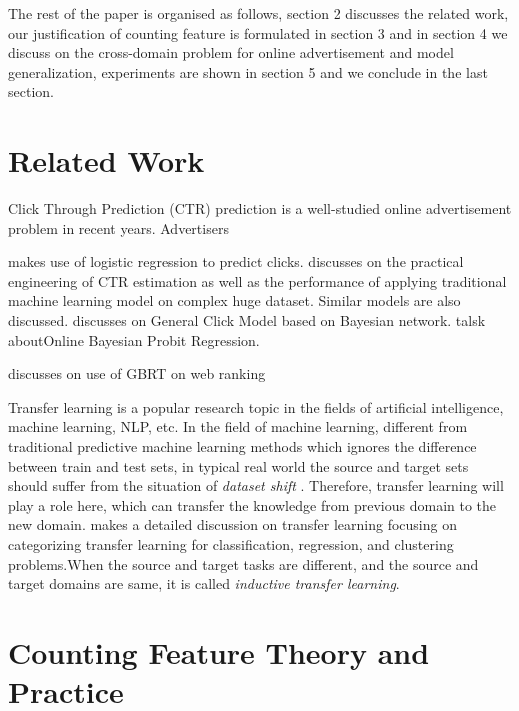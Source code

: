 \documentclass{sig-alternate}
\begin{document}
The rest of the paper is organised as follows, section 2 discusses the related work, our justification of counting feature is formulated in section 3 and in section 4 we discuss on the cross-domain problem for online advertisement and model generalization, experiments are shown in section 5 and we conclude in the last section.



\section{Related Work}



Click Through Prediction (CTR) prediction is a well-studied online advertisement problem in recent years. Advertisers 



 \cite{richardson2007predicting} makes use of logistic regression to predict clicks. \cite{mcmahan2013ad} discusses on the practical engineering of CTR estimation as well as the performance of applying traditional machine learning model on complex huge dataset. Similar models are also discussed. \cite{zhu2010novel} discusses on General Click Model based on Bayesian network. \cite{graepel2010web} talsk aboutOnline Bayesian Probit Regression. 


\cite{mohan2011web} discusses on use of GBRT on web ranking


Transfer learning is a popular research topic in the fields of artificial intelligence, machine learning, NLP, etc. In the field of machine learning, different from traditional predictive machine learning methods which ignores the difference between train and test sets, in typical real world the source and target sets should suffer from the situation of \textit{dataset shift} \cite{quionero2009dataset}. Therefore, transfer learning will play a role here, which can transfer the knowledge from previous domain to the new domain. \cite{pan2010survey} makes a detailed discussion on transfer learning focusing on categorizing transfer learning for classification, regression, and clustering problems.When the source and target tasks are different, and the source and target domains are same, it is called \textit{inductive transfer learning}. 



\section{Counting Feature Theory and Practice}
\end{document}

